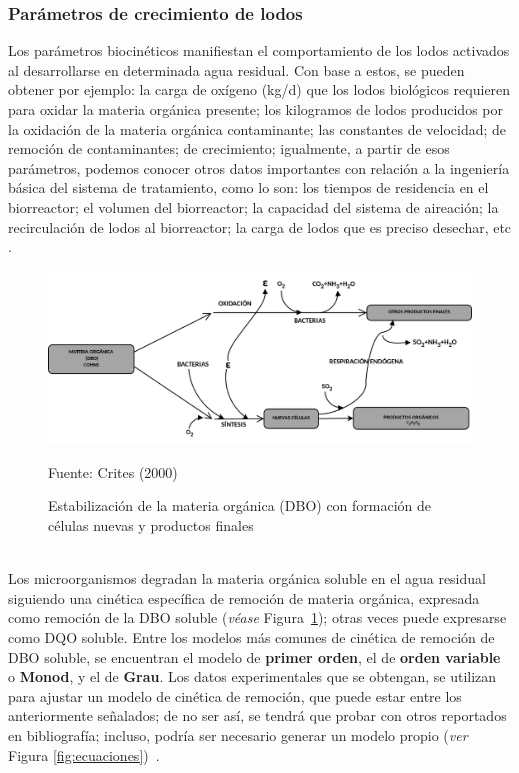 \subsubsection*{Parámetros de crecimiento de lodos}
Los parámetros biocinéticos manifiestan el comportamiento de los lodos activados al desarrollarse en determinada agua residual. Con base a estos, se pueden obtener por ejemplo: la carga de oxígeno (kg/d) que los lodos biológicos requieren para oxidar la materia orgánica presente; los kilogramos de lodos producidos por la oxidación de la materia orgánica contaminante; las constantes de velocidad; de remoción de contaminantes; de crecimiento; igualmente, a partir de esos parámetros, podemos conocer otros datos importantes con relación a la ingeniería básica del sistema de tratamiento, como lo son: los tiempos de residencia en el biorreactor; el volumen del biorreactor; la capacidad del sistema de aireación; la recirculación de lodos al biorreactor; la carga de lodos que es preciso desechar, etc \emph{\citep{martinez2005}}.
	\begin{figure}[!h]
		\begin{center}
		\includegraphics[scale=0.25]{Estabilizacion_mat_org.png}
		\caption{Estabilización de la materia orgánica (DBO) con formación de células nuevas y productos finales}
		\small{Fuente: Crites (2000)}
		\label{fig:estabilizacion}
		\end{center}
	\end{figure}
\\Los microorganismos degradan la materia orgánica soluble en el agua residual siguiendo una cinética específica de remoción de materia orgánica, expresada como remoción de la DBO soluble (\emph{véase} Figura~\ref{fig:estabilizacion}); otras veces puede expresarse como DQO soluble. Entre los modelos más comunes de cinética de remoción de DBO soluble, se encuentran el modelo de \textbf{primer orden}, el de \textbf{orden variable} o \textbf{Monod}, y el de \textbf{Grau}. Los datos experimentales que se obtengan, se utilizan para ajustar un modelo de cinética de remoción, que puede estar entre los anteriormente señalados; de no ser así, se tendrá que probar con otros reportados en bibliografía; incluso, podría ser necesario generar un modelo propio (\emph{ver} Figura \ref{fig:ecuaciones})~\emph{\citep{martinez2005}}.\\ \\ \\
